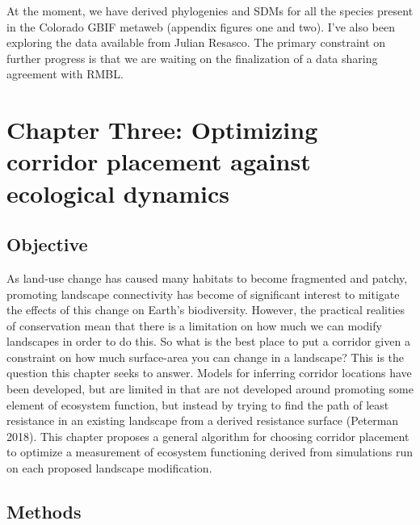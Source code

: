 \documentclass[10pt,oneside]{article}
\begin{document}
At the moment, we have derived phylogenies and SDMs for all the species
present in the Colorado GBIF metaweb (appendix figures one and two).
I've also been exploring the data available from Julian Resasco. The
primary constraint on further progress is that we are waiting on the
finalization of a data sharing agreement with RMBL.

\hypertarget{chapter-three-optimizing-corridor-placement-against-ecological-dynamics}{%
\section{Chapter Three: Optimizing corridor placement against ecological
dynamics}\label{chapter-three-optimizing-corridor-placement-against-ecological-dynamics}}

\hypertarget{objective-2}{%
\subsection{Objective}\label{objective-2}}

As land-use change has caused many habitats to become fragmented and
patchy, promoting landscape connectivity has become of significant
interest to mitigate the effects of this change on Earth's biodiversity.
However, the practical realities of conservation mean that there is a
limitation on how much we can modify landscapes in order to do this. So
what is the best place to put a corridor given a constraint on how much
surface-area you can change in a landscape? This is the question this
chapter seeks to answer. Models for inferring corridor locations have
been developed, but are limited in that are not developed around
promoting some element of ecosystem function, but instead by trying to
find the path of least resistance in an existing landscape from a
derived resistance surface (Peterman 2018). This chapter proposes a
general algorithm for choosing corridor placement to optimize a
measurement of ecosystem functioning derived from simulations run on
each proposed landscape modification.

\hypertarget{methods-2}{%
\subsection{Methods}\label{methods-2}}
\end{document}
